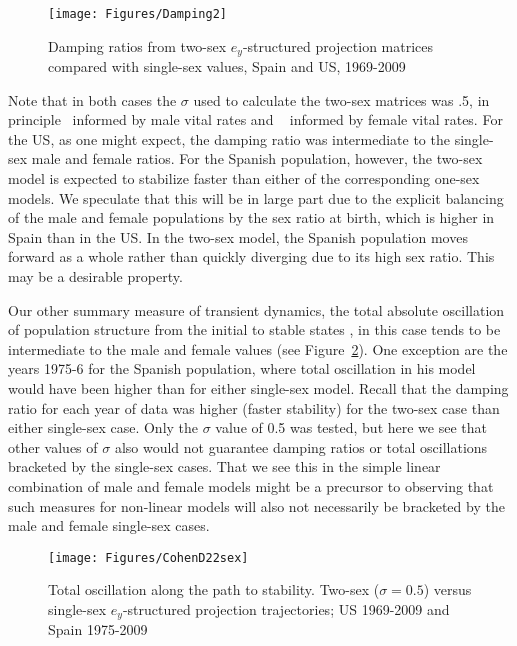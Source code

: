 \begin{figure}[ht!]
        \centering  
        
        
          \caption{Damping ratios from two-sex $e_y$-structured projection
          matrices compared with single-sex values, Spain and US, 1969-2009}
           \texttt{[image: Figures/Damping2]}
          \label{fig:damping2}
\end{figure}
Note that in both cases the $\sigma$ used to calculate the two-sex matrices was
.5, in principle \textonehalf~informed by male vital rates and \textonehalf~
informed by female vital rates. For the US, as one might expect, the damping
ratio was intermediate to the single-sex male and female ratios. For
the Spanish population, however, the two-sex model is expected to stabilize
faster than either of the corresponding one-sex models. We speculate that this
will be in large part due to the explicit balancing of the male and female
populations by the sex ratio at birth, which is higher in Spain than in the US. 
In the two-sex model, the Spanish population moves forward as a whole rather 
than quickly diverging due to its high sex ratio. This may be a desirable
property.

Our other summary measure of transient dynamics, the total absolute
oscillation of population structure from the initial to stable states
\citep{cohen1979cumulative}, in this case tends to be intermediate to the male
and female values (see Figure~\ref{fig:cohend22sex}). One exception are the
years 1975-6 for the Spanish population, where total oscillation in his model
would have been higher than for either single-sex model. Recall that the damping
ratio for each year of data was higher (faster stability) for the two-sex case 
than either single-sex case. Only the $\sigma$ value of 0.5 was tested, but here
we see that other values of $\sigma$ also would not guarantee damping ratios or
total oscillations bracketed by the single-sex cases. That we see this in the
simple linear combination of male and female models might be a precursor to
observing that such measures for non-linear models will also not necessarily be
bracketed by the male and female single-sex cases.

\begin{figure}[ht!]
        \centering  
          \caption{Total oscillation along the path to
       stability. Two-sex ($\sigma = 0.5$) versus single-sex $e_y$-structured
       projection trajectories; US 1969-2009 and Spain 1975-2009}
           \texttt{[image: Figures/CohenD22sex]}
          \label{fig:cohend22sex}
\end{figure}
 \FloatBarrier





